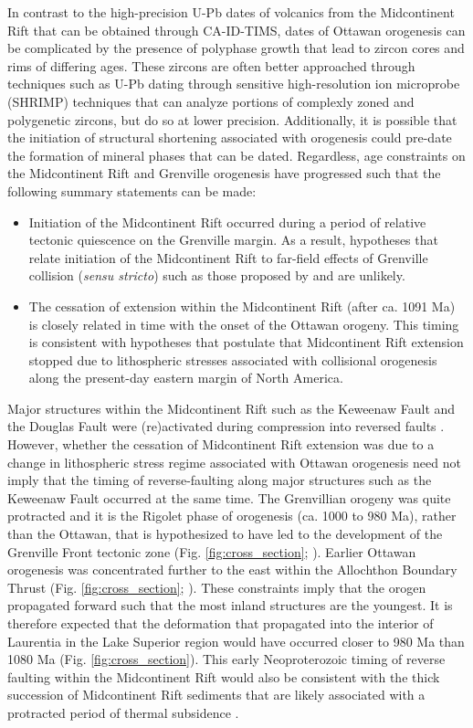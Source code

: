 \documentclass[11pt,letterpaper]{article}
\begin{document}
In contrast to the high-precision U-Pb dates of volcanics from the Midcontinent Rift that can be obtained through CA-ID-TIMS, dates of Ottawan orogenesis can be complicated by the presence of polyphase growth that lead to zircon cores and rims of differing ages. These zircons are often better approached through techniques such as U-Pb dating through sensitive high-resolution ion microprobe (SHRIMP) techniques that can analyze portions of complexly zoned and polygenetic zircons, but do so at lower precision. Additionally, it is possible that the initiation of structural shortening associated with orogenesis could pre-date the formation of mineral phases that can be dated. Regardless, age constraints on the Midcontinent Rift and Grenville orogenesis have progressed such that the following summary statements can be made:
\begin{itemize}
\item Initiation of the Midcontinent Rift occurred during a period of relative tectonic quiescence on the Grenville margin. As a result, hypotheses that relate initiation of the Midcontinent Rift to far-field effects of Grenville collision (\textit{sensu stricto}) such as those proposed by \cite{Van-Schmus1985a} and \cite{Gordon1986a} are unlikely.
\item The cessation of extension within the Midcontinent Rift (after ca. 1091 Ma) is closely related in time with the onset of the Ottawan orogeny. This timing is consistent with hypotheses that postulate that Midcontinent Rift extension stopped due to lithospheric stresses associated with collisional orogenesis along the present-day eastern margin of North America.
\end{itemize}

Major structures within the Midcontinent Rift such as the Keweenaw Fault and the Douglas Fault were (re)activated during compression into reversed faults \citep{Cannon1992b}. However, whether the cessation of Midcontinent Rift extension was due to a change in lithospheric stress regime associated with Ottawan orogenesis need not imply that the timing of reverse-faulting along major structures such as the Keweenaw Fault occurred at the same time. The Grenvillian orogeny was quite protracted and it is the Rigolet phase of orogenesis (ca. 1000 to 980 Ma), rather than the Ottawan, that is hypothesized to have led to the development of the Grenville Front tectonic zone (Fig. \ref{fig:cross_section}; \citealp{Hynes2010a}). Earlier Ottawan orogenesis was concentrated further to the east within the Allochthon Boundary Thrust (Fig. \ref{fig:cross_section}; \citealp{Hynes2010a}). These constraints imply that the orogen propagated forward such that the most inland structures are the youngest. It is therefore expected that the deformation that propagated into the interior of Laurentia in the Lake Superior region would have occurred closer to 980 Ma than 1080 Ma (Fig. \ref{fig:cross_section}). This early Neoproterozoic timing of reverse faulting within the Midcontinent Rift would also be consistent with the thick succession of Midcontinent Rift sediments that are likely associated with a protracted period of thermal subsidence \citep{Cannon1992b}.
\end{document}
